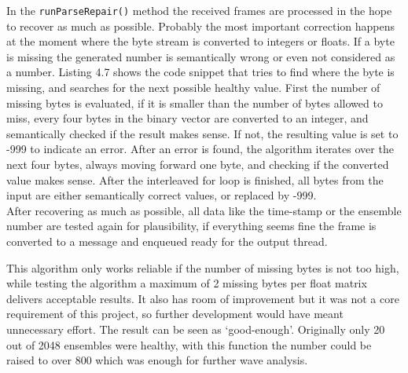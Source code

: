 In the \texttt{runParseRepair()} method the received frames are processed in the hope to recover as much as possible. Probably the most important correction happens at the moment where the byte stream is converted to integers or floats. If a byte is missing the generated number is semantically wrong or even not considered as a number. Listing 4.7 shows the code snippet that tries to find where the byte is missing, and searches for the next possible healthy value. First the number of missing bytes is evaluated, if it is smaller than the number of bytes allowed to miss, every four bytes in the binary vector are converted to an integer, and semantically checked if the result makes sense. If not, the resulting value is set to -999 to indicate an error. After an error is found, the algorithm iterates over the next four bytes, always moving forward one byte, and checking if the converted value makes sense. After the interleaved for loop is finished, all bytes from the input are either semantically correct values, or replaced by -999.\\
After recovering as much as possible, all data like the time-stamp or the ensemble number are tested again for plausibility, if everything seems fine the frame is converted to a message and enqueued ready for the output thread.

This algorithm only works reliable if the number of missing bytes is not too high, while testing the algorithm a maximum of 2 missing bytes per float matrix delivers acceptable results. It also has room of improvement but it was not a core requirement of this project, so further development would have meant unnecessary effort. The result can be seen as `good-enough'. Originally only 20 out of 2048 ensembles were healthy, with this function the number could be raised to over 800 which was enough for further wave analysis.
\vspace{20em}
\pagebreak

